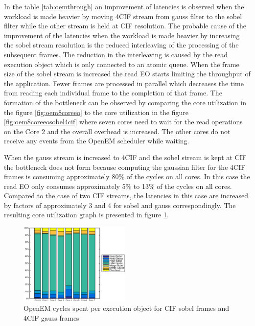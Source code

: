 In the table \ref{tab:oemthrough} an improvement of latencies is observed when the workload is made heavier by moving 4CIF stream from gauss filter to the sobel filter while the other stream is held at CIF resolution. The probable cause of the improvement of the latencies when the workload is made heavier by increasing the sobel stream resolution is the reduced interleaving of the processing of the subsequent frames. The reduction in the interleaving is caused by the read execution object which is only connected to an atomic queue. When the frame size of the sobel stream is increased the read EO starts limiting the throughput of the application. Fewer frames are processed in parallel which decreases the time from reading each individual frame to the completion of that frame. The formation of the bottleneck can be observed by comparing the core utilization in the figure \ref{fig:oem8coreeo} to the core utilization in the figure \ref{fig:oem8coreeosobel4cif} where seven cores need to wait for the read operations on the Core 2 and the overall overhead is increased. The other cores do not receive any events from the OpenEM scheduler while waiting.

When the gauss stream is increased to 4CIF and the sobel stream is kept at CIF the bottleneck does not form because computing the gaussian filter for the 4CIF frames is consuming approximately 80\% of the cycles on all cores. In this case the read EO only consumes approximately 5\% to 13\% of the cycles on all cores. Compared to the case of two CIF streams, the latencies in this case are increased by factors of approximately 3 and 4 for sobel and gauss correspondingly. The resulting core utilization graph is presented in figure \ref{fig:oem8coreeogauss4cif}.

\begin{figure}[h]
    \begin{center}
        \includegraphics[width=0.49\textwidth]{images/openem_sobelcif_gauss4cif_eo.eps}
        \caption{OpenEM cycles spent per execution object for CIF sobel frames
        and 4CIF gauss frames}
        \label{fig:oem8coreeogauss4cif}
    \end{center}
\end{figure}

